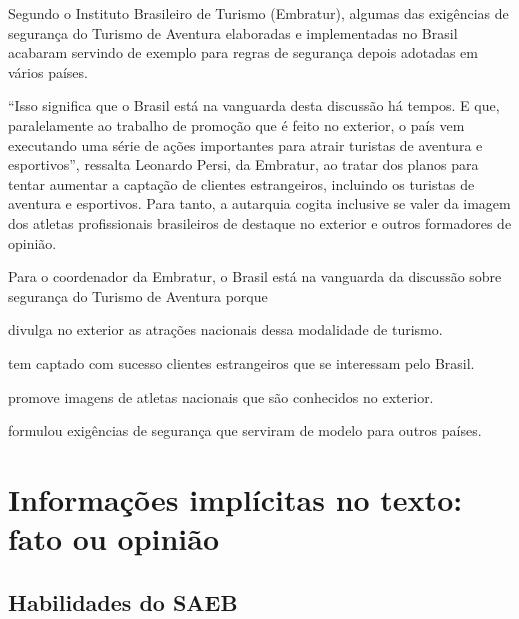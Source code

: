 \begin{myquote}
Segundo o Instituto Brasileiro de Turismo (Embratur), algumas das exigências de
segurança do Turismo de Aventura elaboradas e implementadas no Brasil acabaram 
servindo de exemplo para regras de segurança depois adotadas em vários países.

``Isso significa que o Brasil está na vanguarda desta discussão há tempos. E
que, paralelamente ao trabalho de promoção que é feito no exterior, o país vem
executando uma série de ações importantes para atrair turistas de aventura e
esportivos'', ressalta Leonardo Persi, da Embratur, ao tratar dos planos para tentar
aumentar a captação de clientes estrangeiros, incluindo os turistas de
aventura e esportivos. Para tanto, a autarquia cogita inclusive se valer da
imagem dos atletas profissionais brasileiros de destaque no exterior e outros
formadores de opinião.

\end{myquote}

Para o coordenador da Embratur, o Brasil está na vanguarda da discussão sobre 
segurança do Turismo de Aventura porque 

\begin{escolha}

  \item divulga no exterior as atrações nacionais dessa modalidade de turismo.

  \item tem captado com sucesso clientes estrangeiros que se interessam pelo Brasil.

  \item promove imagens de atletas nacionais que são conhecidos no exterior.

  \item formulou exigências de segurança que serviram de modelo para outros países.

\end{escolha}


\chapter{Informações implícitas no texto: fato ou opinião}

\section*{Habilidades do SAEB}

